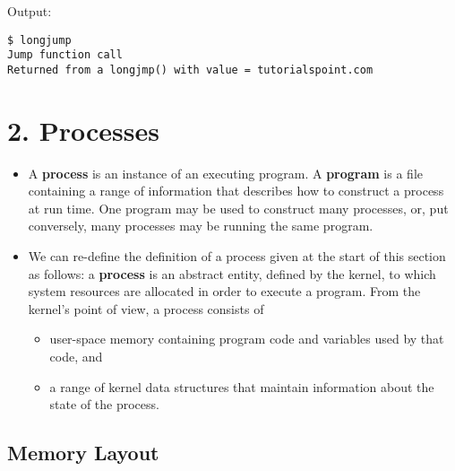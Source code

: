 \documentclass[]{article}
\newenvironment{Shaded}{}{}
\newcommand{\DataTypeTok}[1]{\textcolor[rgb]{0.56,0.13,0.00}{#1}}
\newcommand{\DecValTok}[1]{\textcolor[rgb]{0.25,0.63,0.44}{#1}}
\newcommand{\StringTok}[1]{\textcolor[rgb]{0.25,0.44,0.63}{#1}}
\newcommand{\ControlFlowTok}[1]{\textcolor[rgb]{0.00,0.44,0.13}{\textbf{#1}}}
\newcommand{\NormalTok}[1]{#1}
\begin{document}
\begin{itemize}
\begin{Shaded}
\begin{Highlighting}[]
{   \ControlFlowTok{return}\NormalTok{(}\DecValTok{0}\NormalTok{);}
\NormalTok{\}}

\DataTypeTok{void}\NormalTok{ jmpfunction(jmp_buf env_buf) \{}
\NormalTok{   longjmp(env_buf, }\StringTok{"tutorialspoint.com"}\NormalTok{);}
\NormalTok{\}}
\end{Highlighting}
\end{Shaded}

  Output:

\begin{verbatim}
$ longjump
Jump function call
Returned from a longjmp() with value = tutorialspoint.com
\end{verbatim}
\end{itemize}

\section{\texorpdfstring{\textbf{2.
Processes}}{2. Processes}}\label{header-n138}

\begin{itemize}
\item
  A \textbf{process} is an instance of an executing program. A
  \textbf{program} is a file containing a range of information that
  describes how to construct a process at run time. One program may be
  used to construct many processes, or, put conversely, many processes
  may be running the same program.
\item
  We can re-define the definition of a process given at the start of
  this section as follows: a \textbf{process} is an abstract entity,
  defined by the kernel, to which system resources are allocated in
  order to execute a program. From the kernel's point of view, a process
  consists of

  \begin{itemize}
  \item
    user-space memory containing program code and variables used by that
    code, and 
  \item
    a range of kernel data structures that maintain information about
    the state of the process. 
  \end{itemize}
\end{itemize}

\subsection{\texorpdfstring{\textbf{Memory
Layout}}{Memory Layout}}\label{header-n150}
\end{document}
